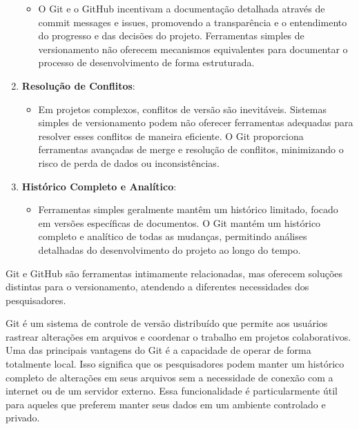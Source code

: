 \documentclass[
  a4paper,
]{article}
\providecommand{\tightlist}{%
  \setlength{\itemsep}{0pt}\setlength{\parskip}{0pt}}\usepackage{longtable,booktabs,array}
\begin{document}
\begin{enumerate}
  \begin{itemize}
  \tightlist
  \item
    O Git e o GitHub incentivam a documentação detalhada através de
    commit messages e issues, promovendo a transparência e o
    entendimento do progresso e das decisões do projeto. Ferramentas
    simples de versionamento não oferecem mecanismos equivalentes para
    documentar o processo de desenvolvimento de forma estruturada.
  \end{itemize}
\item
  \textbf{Resolução de Conflitos}:

  \begin{itemize}
  \tightlist
  \item
    Em projetos complexos, conflitos de versão são inevitáveis. Sistemas
    simples de versionamento podem não oferecer ferramentas adequadas
    para resolver esses conflitos de maneira eficiente. O Git
    proporciona ferramentas avançadas de merge e resolução de conflitos,
    minimizando o risco de perda de dados ou inconsistências.
  \end{itemize}
\item
  \textbf{Histórico Completo e Analítico}:

  \begin{itemize}
  \tightlist
  \item
    Ferramentas simples geralmente mantêm um histórico limitado, focado
    em versões específicas de documentos. O Git mantém um histórico
    completo e analítico de todas as mudanças, permitindo análises
    detalhadas do desenvolvimento do projeto ao longo do tempo.
  \end{itemize}
\end{enumerate}

Git e GitHub são ferramentas intimamente relacionadas, mas oferecem
soluções distintas para o versionamento, atendendo a diferentes
necessidades dos pesquisadores.

Git é um sistema de controle de versão distribuído que permite aos
usuários rastrear alterações em arquivos e coordenar o trabalho em
projetos colaborativos. Uma das principais vantagens do Git é a
capacidade de operar de forma totalmente local. Isso significa que os
pesquisadores podem manter um histórico completo de alterações em seus
arquivos sem a necessidade de conexão com a internet ou de um servidor
externo. Essa funcionalidade é particularmente útil para aqueles que
preferem manter seus dados em um ambiente controlado e privado.
\end{document}
